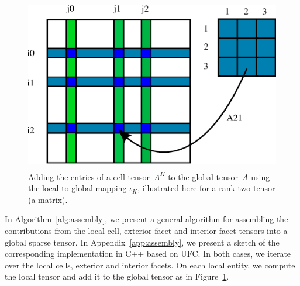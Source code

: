 \begin{figure}[htbp]
  \begin{center}
    \includegraphics[height=3in]{eps/insertion.eps}
    \caption{Adding the entries of a cell tensor~$A^K$ to the
      global tensor~$A$ using the  local-to-global mapping
      $\iota_K$, illustrated here for a rank two
      tensor (a matrix).}
    \label{fig:insertion}
  \end{center}
\end{figure}

In Algorithm~\ref{alg:assembly}, we present a general algorithm for
assembling the contributions from the local cell, exterior facet and
interior facet tensors into a global sparse tensor. In
Appendix~\ref{app:assembly}, we present a sketch of the corresponding
implementation in C++ based on UFC. In both cases, we iterate over the
local cells, exterior and interior facets. On each local entity, we
compute the local tensor and add it to the global tensor as in
Figure~\ref{fig:insertion}.

